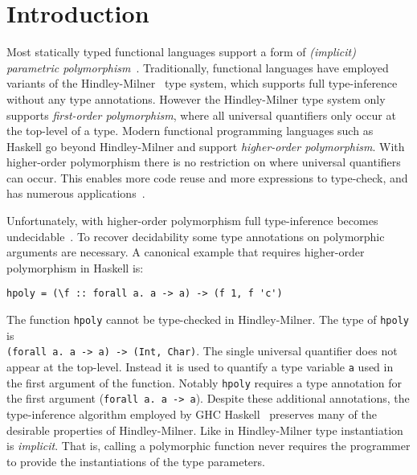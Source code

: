 \section{Introduction}

Most statically typed functional languages support a form of
\emph{(implicit) parametric polymorphism}~\cite{reynolds1983types}.
Traditionally, functional languages have employed variants of the
Hindley-Milner~\cite{hindley1969principal,milner1978theory,damas1982principal}
type system, which supports full type-inference without any type annotations.
However the Hindley-Milner type system only supports \emph{first-order
polymorphism}, where all universal quantifiers only occur at the top-level
of a type.  Modern functional programming languages such as Haskell go beyond
Hindley-Milner and support \emph{higher-order polymorphism}. With higher-order
polymorphism there is no restriction on where universal quantifiers can occur.
This enables more code reuse and more expressions to type-check, and has
numerous applications~\cite{jones1995functional,gill1993short,launchbury1995state,lammel2003scrap}.

Unfortunately, with higher-order polymorphism full type-inference becomes
undecidable~\cite{wells1999typability}. To recover decidability some type annotations 
on polymorphic arguments
are necessary. 
A canonical example that requires higher-order polymorphism in Haskell is:
\begin{verbatim}
hpoly = (\f :: forall a. a -> a) -> (f 1, f 'c')
\end{verbatim}
The function \verb|hpoly| cannot be
type-checked in Hindley-Milner.  The type of \verb|hpoly| is \\
\verb|(forall a. a -> a) -> (Int, Char)|. The single universal quantifier
does not appear at the top-level. Instead it is used to quantify a
type variable \verb|a| used in the first argument of the
function.
Notably \verb|hpoly| requires a type annotation for the first
argument (\verb|forall a. a -> a|). 
Despite these additional annotations,
the type-inference algorithm employed by GHC Haskell~\cite{jones2007practical} preserves 
many of the desirable properties of Hindley-Milner. 
Like in Hindley-Milner type instantiation is \emph{implicit}. That is,
calling a polymorphic function never requires the programmer to 
provide the instantiations of the type parameters.

